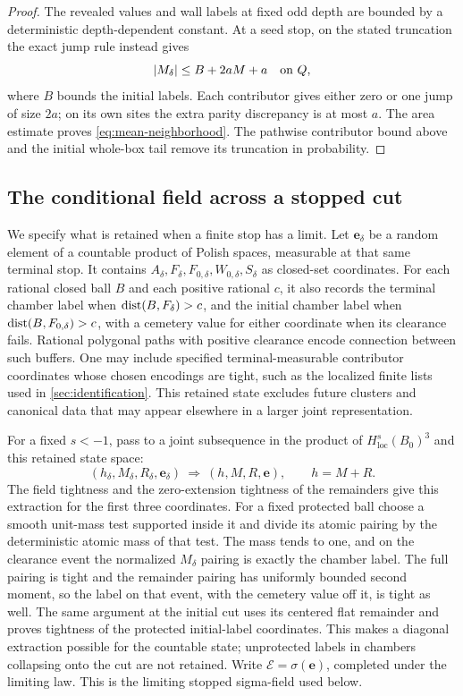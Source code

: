 \begin{proof}
The revealed values and wall labels at fixed odd depth are bounded
by a deterministic depth-dependent constant. At a seed stop, on the
stated truncation the exact jump rule instead gives
\[
        |M_\delta|\le B+2aM+a\quad\hbox{on }Q,
\]
where \(B\) bounds the initial labels. Each contributor gives either
zero or one jump of size \(2a\); on its own sites the extra parity
discrepancy is at most \(a\). The area estimate proves
\eqref{eq:mean-neighborhood}. The pathwise contributor bound above
and the initial whole-box tail remove its truncation in probability.
\end{proof}

\subsection{The conditional field across a stopped cut}

We specify what is retained when a finite stop has a limit. Let
\(\mathbf e_\delta\) be a random element of a countable product of
Polish spaces, measurable at that same terminal stop. It
contains \(A_\delta,F_\delta,F_{0,\delta},W_{0,\delta},S_\delta\) as
closed-set coordinates. For each rational closed ball \(B\) and each
positive rational \(c\), it also records the terminal chamber label
when \(\operatorname{dist}(B,F_\delta)>c\), and the initial chamber label when
\(\operatorname{dist}(B,F_{0,\delta})>c\), with a cemetery value for either coordinate
when its clearance fails. Rational polygonal paths with positive clearance encode
connection between such buffers. One may include specified terminal-measurable
contributor coordinates whose chosen encodings are tight, such as the
localized finite lists used in \cref{sec:identification}. This retained
state excludes future clusters and canonical data that may appear
elsewhere in a larger joint representation.

For a fixed \(s<-1\), pass to a joint subsequence in the product of
\(H^s_{\mathrm{loc}}(B_0)^3\) and this retained state space:
\begin{equation}
 (h_\delta,M_\delta,R_\delta,\mathbf e_\delta)
       \ \Longrightarrow\ (h,M,R,\mathbf e),
 \qquad h=M+R.
 \label{eq:stopped-joint-extraction}
\end{equation}
The field tightness and the zero-extension tightness of the remainders
give this extraction for the first three coordinates. For a fixed
protected ball choose a smooth unit-mass test supported inside it and
divide its atomic pairing by the deterministic atomic mass of that test.
The mass tends to one, and on the clearance event the normalized
\(M_\delta\) pairing is exactly the chamber label. The full pairing is
tight and the remainder pairing has uniformly bounded second moment, so
the label on that event, with the cemetery value off it, is tight as well.
The same argument at the initial cut uses its centered flat remainder
and proves tightness of the protected initial-label coordinates.
This makes a diagonal extraction possible for the countable state;
unprotected labels in chambers collapsing onto the cut are not retained.
Write
\(\mathscr E=\sigma(\mathbf e)\), completed under the limiting law.
This is the limiting stopped sigma-field used below.


